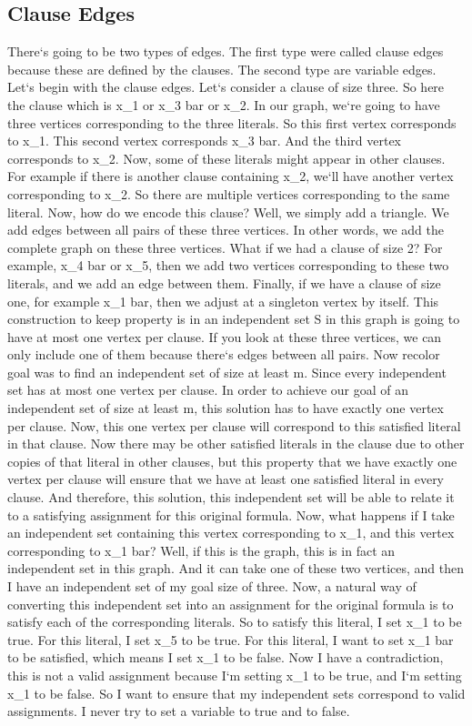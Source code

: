 \subsection{Clause Edges}
There`s going to be two types of edges.
The first type were called clause edges because these are defined by the clauses.
The second type are variable edges.
Let`s begin with the clause edges.
Let`s consider a clause of size three.
So here the clause which is x\_1 or x\_3 bar or x\_2.
In our graph, we`re going to have three vertices corresponding to the three literals.
So this first vertex corresponds to x\_1.
This second vertex corresponds x\_3 bar.
And the third vertex corresponds to x\_2.
Now, some of these literals might appear in other clauses.
For example if there is another clause containing x\_2, we`ll have another vertex corresponding to x\_2.
So there are multiple vertices corresponding to the same literal.
Now, how do we encode this clause? Well, we simply add a triangle.
We add edges between all pairs of these three vertices.
In other words, we add the complete graph on these three vertices.
What if we had a clause of size 2? For example, x\_4 bar or x\_5, then we add two vertices corresponding to these two literals, and we add an edge between them.
Finally, if we have a clause of size one, for example x\_1 bar, then we adjust at a singleton vertex by itself.
This construction to keep property is in an independent set S in this graph is going to have at most one vertex per clause.
If you look at these three vertices, we can only include one of them because there`s edges between all pairs.
Now recolor goal was to find an independent set of size at least m.
Since every independent set has at most one vertex per clause.
In order to achieve our goal of an independent set of size at least m, this solution has to have exactly one vertex per clause.
Now, this one vertex per clause will correspond to this satisfied literal in that clause.
Now there may be other satisfied literals in the clause due to other copies of that literal in other clauses, but this property that we have exactly one vertex per clause will ensure that we have at least one satisfied literal in every clause.
And therefore, this solution, this independent set will be able to relate it to a satisfying assignment for this original formula.
Now, what happens if I take an independent set containing this vertex corresponding to x\_1, and this vertex corresponding to x\_1 bar? Well, if this is the graph, this is in fact an independent set in this graph.
And it can take one of these two vertices, and then I have an independent set of my goal size of three.
Now, a natural way of converting this independent set into an assignment for the original formula is to satisfy each of the corresponding literals.
So to satisfy this literal, I set x\_1 to be true.
For this literal, I set x\_5 to be true.
For this literal, I want to set x\_1 bar to be satisfied, which means I set x\_1 to be false.
Now I have a contradiction, this is not a valid assignment because I`m setting x\_1 to be true, and I`m setting x\_1 to be false.
So I want to ensure that my independent sets correspond to valid assignments.
I never try to set a variable to true and to false.

